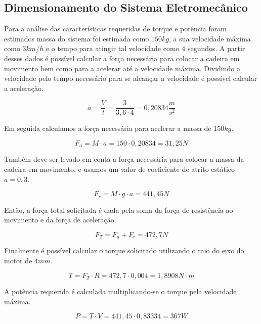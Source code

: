 \subsection{Dimensionamento do Sistema Eletromecânico}

Para a análise das características requeridas de torque e potência foram estimados
massa do sistema foi estimada como $150 kg$, a sua velocidade máxima como $3 km/h$
e o tempo para atingir tal velocidade como $4$ segundos. A partir desses dados é
possível calcular a força necessária para colocar a cadeira em movimento bem como
para a acelerar até a velocidade máxima. Dividindo a velocidade pelo tempo necessário
para se alcançar a velocidade é possível calcular a aceleração.

\begin{equation}
a = \frac{V}{t} = \frac{3}{3,6\cdot 4} = 0,20834  \frac{m}{s^2}
\end{equation}

Em seguida calculamos a força necessária para acelerar a massa de $150 kg$.

\begin{equation}
F_{a} = M \cdot a = 150 \cdot 0,20834 = 31,25 N
\end{equation}

Também deve ser levado em conta a força necessária para colocar a massa da cadeira
em movimento, e usamos um valor de coeficiente de atrito estático $a = 0,3$.

\begin{equation}
F_{r} = M \cdot g \cdot a = 441,45 N
\end{equation}

Então, a força total solicitada é dada pela soma da força de resistência ao movimento
e da força de aceleração.

\begin{equation}
F_{T} = F_{a} + F_{r} = 472,7 N
\end{equation}

Finalmente é possível calcular o torque solicitado utilizando o raio do eixo do
motor de $4mm$.

\begin{equation}
T = F_{T} \cdot R = 472,7 \cdot 0,004 = 1,8908 N\cdot m
\end{equation}

A potência requerida é calculada multiplicando-se o torque pela velocidade máxima.

\begin{equation}
P = T \cdot V = 441,45 \cdot 0,83334 = 367 W
\end{equation}


